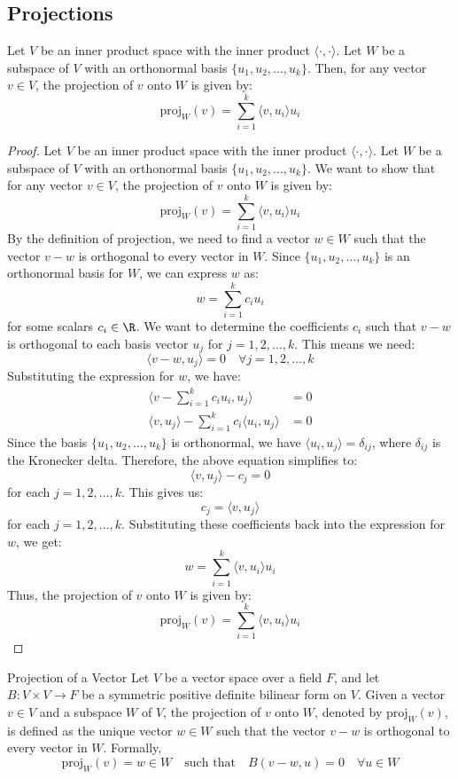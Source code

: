 \documentclass[openany]{book}
\begin{document}
\subsection{Projections}
\begin{mytheorem}
    Let $V$ be an inner product space with the inner product $\langle \cdot, \cdot \rangle$. Let $W$ be a subspace of $V$ with an orthonormal basis $\{u_1, u_2, \ldots, u_k\}$. Then, for any vector $v \in V$, the projection of $v$ onto $W$ is given by:
    $$\text{proj}_W(v) = \sum_{i=1}^k \langle v, u_i \rangle u_i$$
\end{mytheorem}
\begin{proof}
Let $V$ be an inner product space with the inner product $\langle \cdot, \cdot \rangle$. Let $W$ be a subspace of $V$ with an orthonormal basis $\{u_1, u_2, \ldots, u_k\}$. We want to show that for any vector $v \in V$, the projection of $v$ onto $W$ is given by:
$$\text{proj}_W(v) = \sum_{i=1}^k \langle v, u_i \rangle u_i$$
By the definition of projection, we need to find a vector $w \in W$ such that the vector $v - w$ is orthogonal to every vector in $W$. Since $\{u_1, u_2, \ldots, u_k\}$ is an orthonormal basis for $W$, we can express $w$ as:
$$w = \sum_{i=1}^k c_i u_i$$
for some scalars $c_i \in \R$. We want to determine the coefficients $c_i$ such that $v - w$ is orthogonal to each basis vector $u_j$ for $j = 1, 2, \ldots, k$. This means we need:
$$\langle v - w, u_j \rangle = 0 \quad \forall j = 1, 2, \ldots, k$$
Substituting the expression for $w$, we have:
\[\begin{aligned}
\langle v - \sum_{i=1}^k c_i u_i, u_j \rangle &= 0 \\
\langle v, u_j \rangle - \sum_{i=1}^k c_i \langle u_i, u_j \rangle &= 0
\end{aligned}\]
Since the basis $\{u_1, u_2, \ldots, u_k\}$ is orthonormal, we have $\langle u_i, u_j \rangle = \delta_{ij}$, where $\delta_{ij}$ is the Kronecker delta. Therefore, the above equation simplifies to:
$$\langle v, u_j \rangle - c_j = 0$$
for each $j = 1, 2, \ldots, k$. This gives us:
$$c_j = \langle v, u_j \rangle$$
for each $j = 1, 2, \ldots, k$. Substituting these coefficients back into the expression for $w$, we get:
$$w = \sum_{i=1}^k \langle v, u_i \rangle u_i$$
Thus, the projection of $v$ onto $W$ is given by:
$$\text{proj}_W(v) = \sum_{i=1}^k \langle v, u_i \rangle u_i$$
\end{proof}
\begin{mydefinition}{Projection of a Vector}
Let $V$ be a vector space over a field $F$, and let $B: V \times V \to F$ be a symmetric positive definite bilinear form on $V$. Given a vector $v \in V$ and a subspace $W$ of $V$, the projection of $v$ onto $W$, denoted by $\text{proj}_W(v)$, is defined as the unique vector $w \in W$ such that the vector $v - w$ is orthogonal to every vector in $W$. Formally,
$$\text{proj}_W(v) = w \in W \quad \text{such that} \quad B(v - w, u) = 0 \quad \forall u \in W$$
\end{mydefinition}
\end{document}
